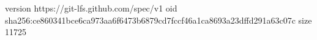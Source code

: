version https://git-lfs.github.com/spec/v1
oid sha256:ce860341bce6ca973aa6f6473b6879cd7fccf46a1ca8693a23dffd291a63c07c
size 11725
